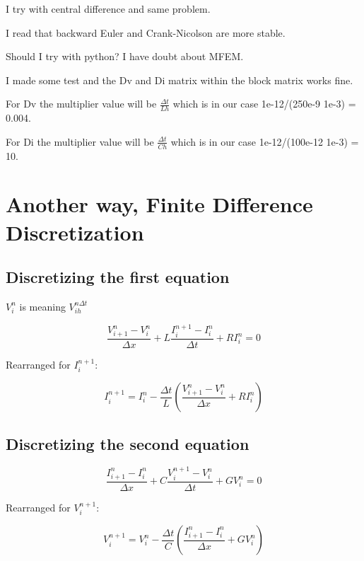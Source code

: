 \documentclass[12pt, letterpaper]{article}
\begin{document}
I try with central difference and same problem.

I read that backward Euler and Crank-Nicolson are more stable.

Should I try with python? I have doubt about MFEM.

I made some test and the Dv and Di matrix within the block matrix works fine.

For Dv the multiplier value will be $\frac{\Delta t}{L h}$ which is in our case 1e-12/(250e-9 1e-3) = 0.004.

For Di the multiplier value will be $\frac{\Delta t}{C h}$ which is in our case 1e-12/(100e-12 1e-3) = 10.



\section{Another way, Finite Difference Discretization}

\subsection{Discretizing the first equation}

$V_i^n$ is meaning $V_{i h}^{n \Delta t}$

\begin{equation}
	\frac{V_{i+1}^n - V_i^n}{\Delta x} + L \frac{I_i^{n+1} - I_i^n}{\Delta t} + R I_i^n = 0
\end{equation}

Rearranged for \( I_i^{n+1} \):

\begin{equation}
	I_i^{n+1} = I_i^n - \frac{\Delta t}{L} \left( \frac{V_{i+1}^n - V_i^n}{\Delta x} + R I_i^n \right)
\end{equation}

\subsection{Discretizing the second equation}

\begin{equation}
	\frac{I_{i+1}^n - I_i^n}{\Delta x} + C \frac{V_i^{n+1} - V_i^n}{\Delta t} + G V_i^n = 0
\end{equation}

Rearranged for \( V_i^{n+1} \):

\begin{equation}
	V_i^{n+1} = V_i^n - \frac{\Delta t}{C} \left( \frac{I_{i+1}^n - I_i^n}{\Delta x} + G V_i^n \right)
\end{equation}
\end{document}
